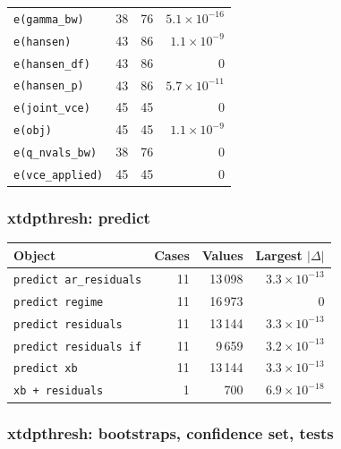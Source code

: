 \documentclass[
  10.5pt,
  a4paper,
]{article}
\begin{document}
\begin{longtable}{@{}p{8.2cm}rrr@{}}
\texttt{e(gamma\_\allowbreak{}bw)} & 38 & 76 & $5.1\times10^{-16}$ \\
\texttt{e(hansen)} & 43 & 86 & $1.1\times10^{-9}$ \\
\texttt{e(hansen\_\allowbreak{}df)} & 43 & 86 & 0 \\
\texttt{e(hansen\_\allowbreak{}p)} & 43 & 86 & $5.7\times10^{-11}$ \\
\texttt{e(joint\_\allowbreak{}vce)} & 45 & 45 & 0 \\
\texttt{e(obj)} & 45 & 45 & $1.1\times10^{-9}$ \\
\texttt{e(q\_\allowbreak{}nvals\_\allowbreak{}bw)} & 38 & 76 & 0 \\
\texttt{e(vce\_\allowbreak{}applied)} & 45 & 45 & 0 \\
\bottomrule
\end{longtable}

\subsubsection*{xtdpthresh: predict}

\begin{longtable}{@{}p{8.2cm}rrr@{}}
\toprule
Object & Cases & Values & Largest $|\Delta|$ \\
\midrule
\endhead
\texttt{predict ar\_\allowbreak{}residuals} & 11 & 13\,098 & $3.3\times10^{-13}$ \\
\texttt{predict regime} & 11 & 16\,973 & 0 \\
\texttt{predict residuals} & 11 & 13\,144 & $3.3\times10^{-13}$ \\
\texttt{predict residuals if} & 11 & 9\,659 & $3.2\times10^{-13}$ \\
\texttt{predict xb} & 11 & 13\,144 & $3.3\times10^{-13}$ \\
\texttt{xb + residuals} & 1 & 700 & $6.9\times10^{-18}$ \\
\bottomrule
\end{longtable}

\subsubsection*{xtdpthresh: bootstraps, confidence set, tests}
\end{document}
